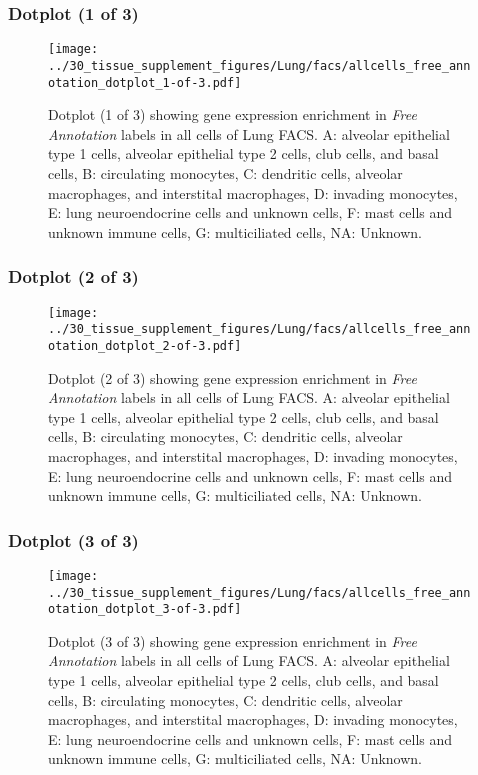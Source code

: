 \clearpage

\subsubsection{Dotplot (1 of 3)}
\begin{figure}[h]
\centering
\texttt{[image: ../30\_tissue\_supplement\_figures/Lung/facs/allcells\_free\_annotation\_dotplot\_1-of-3.pdf]}

\caption{ Dotplot (1 of 3)  showing gene expression enrichment in \emph{Free Annotation} labels in all cells of Lung FACS. A: alveolar epithelial type 1 cells, alveolar epithelial type 2 cells, club cells, and basal cells, B: circulating monocytes, C: dendritic cells, alveolar macrophages, and interstital macrophages, D: invading monocytes, E: lung neuroendocrine cells and unknown cells, F: mast cells and unknown immune cells, G: multiciliated cells, NA: Unknown.}
\end{figure}


\clearpage

\subsubsection{Dotplot (2 of 3)}
\begin{figure}[h]
\centering
\texttt{[image: ../30\_tissue\_supplement\_figures/Lung/facs/allcells\_free\_annotation\_dotplot\_2-of-3.pdf]}

\caption{ Dotplot (2 of 3)  showing gene expression enrichment in \emph{Free Annotation} labels in all cells of Lung FACS. A: alveolar epithelial type 1 cells, alveolar epithelial type 2 cells, club cells, and basal cells, B: circulating monocytes, C: dendritic cells, alveolar macrophages, and interstital macrophages, D: invading monocytes, E: lung neuroendocrine cells and unknown cells, F: mast cells and unknown immune cells, G: multiciliated cells, NA: Unknown.}
\end{figure}


\clearpage

\subsubsection{Dotplot (3 of 3)}
\begin{figure}[h]
\centering
\texttt{[image: ../30\_tissue\_supplement\_figures/Lung/facs/allcells\_free\_annotation\_dotplot\_3-of-3.pdf]}

\caption{ Dotplot (3 of 3)  showing gene expression enrichment in \emph{Free Annotation} labels in all cells of Lung FACS. A: alveolar epithelial type 1 cells, alveolar epithelial type 2 cells, club cells, and basal cells, B: circulating monocytes, C: dendritic cells, alveolar macrophages, and interstital macrophages, D: invading monocytes, E: lung neuroendocrine cells and unknown cells, F: mast cells and unknown immune cells, G: multiciliated cells, NA: Unknown.}
\end{figure}

